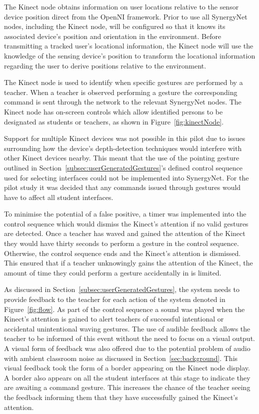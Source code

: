 \documentclass[link]{IWCOMP}
\begin{document}
The Kinect node obtains information on user locations relative to the sensor device position direct from the OpenNI framework.
Prior to use all SynergyNet nodes, including the Kinect node, will be configured so that it knows its associated device's position and orientation in the environment.
Before transmitting a tracked user's locational information, the Kinect node will use the knowledge of the sensing device's position to transform the locational information regarding the user to derive positions relative to the environment.

The Kinect node is used to identify when specific gestures are performed by a teacher.
When a teacher is observed performing a gesture the corresponding command is sent through the network to the relevant SynergyNet nodes.
The Kinect node has on-screen controls which allow identified persons to be designated as students or teachers, as shown in Figure~\ref{fig:kinectNode}.

Support for multiple Kinect devices was not possible in this pilot due to issues surrounding how the device's depth-detection techniques would interfere with other Kinect devices nearby.
This meant that the use of the pointing gesture outlined in Section~\ref{subsec:userGeneratedGestures}'s defined control sequence used for selecting interfaces could not be implemented into SynergyNet.
For the pilot study it was decided that any commands issued through gestures would have to affect all student interfaces.

To minimise the potential of a false positive, a timer was implemented into the control sequence which would dismiss the Kinect's attention if no valid gestures are detected.
Once a teacher has waved and gained the attention of the Kinect they would have thirty seconds to perform a gesture in the control sequence.
Otherwise, the control sequence ends and the Kinect's attention is dismissed.
This ensured that if a teacher unknowingly gains the attention of the Kinect, the amount of time they could perform a gesture accidentally in is limited.

As discussed in Section~\ref{subsec:userGeneratedGestures}, the system needs to provide feedback to the teacher for each action of the system denoted in Figure~\ref{fig:flow}.
As part of the control sequence a sound was played when the Kinect's attention is gained to alert teachers of successful intentional or accidental unintentional waving gestures.
The use of audible feedback allows the teacher to be informed of this event without the need to focus on a visual output.
A visual form of feedback was also offered due to the potential problem of audio with ambient classroom noise as discussed in Section~\ref{sec:background}.
This visual feedback took the form of a border appearing on the Kinect node display.
A border also appears on all the student interfaces at this stage to indicate they are awaiting a command gesture.
This increases the chance of the teacher seeing the feedback informing them that they have successfully gained the Kinect's attention.
\end{document}
